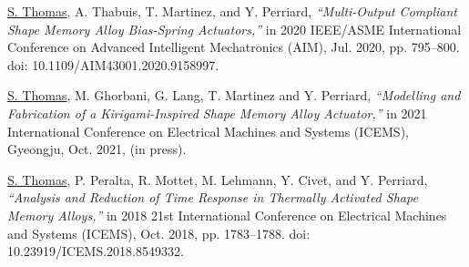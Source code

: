 \underline{S. Thomas}, A. Thabuis, T. Martinez, and Y. Perriard, \textit{“Multi-Output Compliant Shape Memory Alloy Bias-Spring Actuators,”} in 2020 IEEE/ASME International Conference on Advanced Intelligent Mechatronics (AIM), Jul. 2020, pp. 795–800. doi: 10.1109/AIM43001.2020.9158997.

\underline{S. Thomas}, M. Ghorbani, G. Lang, T. Martinez and Y. Perriard, \textit{“Modelling and Fabrication of a Kirigami-Inspired Shape Memory Alloy Actuator,”} in 2021 International Conference on Electrical Machines and Systems (ICEMS), Gyeongju, Oct. 2021, (in press).

\underline{S. Thomas}, P. Peralta, R. Mottet, M. Lehmann, Y. Civet, and Y. Perriard, \textit{“Analysis and Reduction of Time Response in Thermally Activated Shape Memory Alloys,”} in 2018 21st International Conference on Electrical Machines and Systems (ICEMS), Oct. 2018, pp. 1783–1788. doi: 10.23919/ICEMS.2018.8549332.
